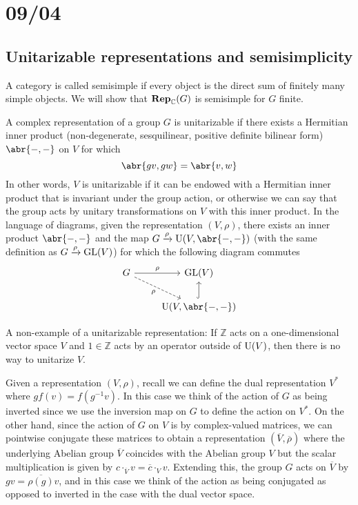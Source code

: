 \documentclass[../../rtnotes.tex]{subfiles}
\begin{document}
\section{09/04}
\subsection{Unitarizable representations and semisimplicity}
A category is called semisimple if every object is the direct sum of finitely many simple objects. We will show that ${\normalfont\mathbf{Rep}}_{\mathbb C}(G)$ is semisimple for $G$ finite.

A complex representation of a group $G$ is unitarizable if there exists a Hermitian inner product (non-degenerate, sesquilinear, positive definite bilinear form) $\abr{-,-}$ on $V$ for which 
\[\abr{gv,gw} = \abr{v,w}\]
In other words, $V$ is unitarizable if it can be endowed with a Hermitian inner product that is invariant under the group action, or otherwise we can say that the group acts by unitary transformations on $V$ with this inner product. In the language of diagrams, given the representation $(V,\rho)$, there exists an inner product $\abr{-,-}$ and the map $G\xrightarrow{\rho} \U(V,\abr{-,-})$ (with the same definition as $G\xrightarrow{\rho} \operatorname{GL}(V)$) for which the following diagram commutes
\[\begin{tikzcd}
	G & {\GL(V)} \\
	& {\U(V,\abr{-,-})}
	\arrow["\rho", from=1-1, to=1-2]
	\arrow["\rho"', dashed, from=1-1, to=2-2]
	\arrow[hook, from=2-2, to=1-2]
\end{tikzcd}\]

A non-example of a unitarizable representation: If $\mathbb Z$ acts on a one-dimensional vector space $V$ and $1\in \mathbb Z$ acts by an operator outside of $\operatorname{U}(V)$, then there is no way to unitarize $V$.

Given a representation $(V,\rho)$, recall we can define the dual representation $V^\ast$ where $gf(v) = f(g^{-1}v)$. In this case we think of the action of $G$ as being inverted since we use the inversion map on $G$ to define the action on $V^\ast$. On the other hand, since the action of $G$ on $V$ is by complex-valued matrices, we can pointwise conjugate these matrices to obtain a representation $(\overline V,\overline \rho)$ where the underlying Abelian group $\overline V$ coincides with the Abelian group $V$ but the scalar multiplication is given by $c\cdot_{\overline V} v = \overline{c}\cdot_Vv$. Extending this, the group $G$ acts on $\overline V$ by $gv = \overline{\rho(g)}v$, and in this case we think of the action as being conjugated as opposed to inverted in the case with the dual vector space.
\end{document}
